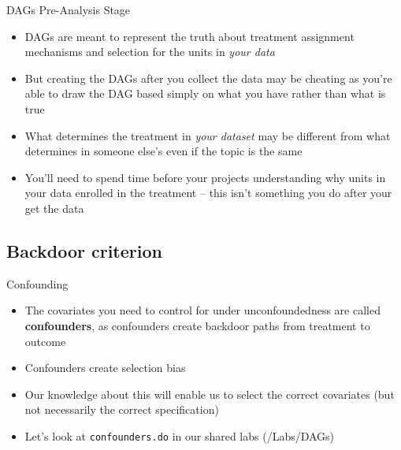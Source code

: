 \documentclass{beamer}
\begin{document}
\begin{frame}{DAGs Pre-Analysis Stage}

	\begin{itemize}
	\item DAGs are meant to represent the truth about treatment assignment mechanisms and selection for the units in \emph{your data} 
	\item But creating the DAGs after you collect the data may be cheating as you're able to draw the DAG based simply on what you have rather than what is true
	\item What determines the treatment in \emph{your dataset} may be different from what determines in someone else's even if the topic is the same
	\item You'll need to spend time before your projects understanding why units in your data enrolled in the treatment -- this isn't something you do after your get the data 
	\end{itemize}
\end{frame}






\subsection{Backdoor criterion}


\begin{frame}{Confounding}

  \begin{itemize}
  	\item The covariates you need to control for under unconfoundedness are called \textbf{confounders}, as confounders create backdoor paths from treatment to outcome
          \item Confounders create selection bias \\

          \begin{center}
          \end{center}

          \item Our knowledge about this will enable us to select the correct covariates (but not necessarily the correct specification)
          \item Let's look at \texttt{confounders.do} in our shared labs (/Labs/DAGs)
  \end{itemize}
\end{frame}
\end{document}
